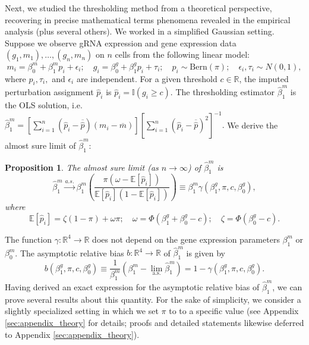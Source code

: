 \documentclass[12pt]{article}
\newtheorem{proposition}{Proposition}
\begin{document}
Next, we studied the thresholding method from a theoretical perspective, recovering in precise mathematical terms phenomena revealed in the empirical analysis (plus several others). We worked in a simplified Gaussian setting. Suppose we observe gRNA expression and gene expression data $(g_1, m_1), \dots, (g_n, m_n)$ on $n$ cells from the following linear model:
\begin{equation}\label{theoretical_model}
m_i = \beta^m_0 + \beta^m_1 p_i + \epsilon_i; \quad
g_i = \beta^g_0 + \beta^g_1 p_i + \tau_i; \quad
p_i \sim \textrm{Bern}(\pi); \quad
\epsilon_i, \tau_i \sim N(0,1),
\end{equation}
where $p_i, \tau_i,$ and $\epsilon_i$ are independent. For a given threshold $c \in \mathbb{R}$, the imputed perturbation assignment $\hat{p}_i$ is $\hat{p}_i = \mathbb{I}(g_i \geq c).$ The thresholding estimator $\hat{\beta}^m_1$ is the OLS solution, i.e. $\hat{\beta}^m_1 = \left[\sum_{i=1}^n (\hat{p}_i - \overline{\hat{p}})(m_i - \overline{m})\right]\left[\sum_{i=1}^n (\hat{p}_i - \overline{\hat{p}})^2\right]^{-1}.$ We derive the almost sure limit of $\hat{\beta}^m_1$: 
\begin{proposition}\label{prop:convergence}
	The almost sure limit (as $n \to \infty$) of $\hat{\beta}^m_1$ is
	\begin{equation}\label{thresh_est_intercepts}
	\hat{\beta}^m_1 \xrightarrow{a.s.} \beta^m_1 \left(\frac{ \pi( \omega - \mathbb{E}[ \hat{p}_i ])}{ \mathbb{E}[\hat{p}_i] (1 - \mathbb{E}[\hat{p}_i])}\right) \equiv \beta^m_1 \gamma(\beta^g_1, \pi, c, \beta^g_0), 
	\end{equation} where 
	$$
	\mathbb{E}[\hat{p}_i] = \zeta(1-\pi) + \omega\pi; \quad \omega = \Phi\left(\beta_1^g + \beta_0^g -c \right); \quad \zeta = \Phi\left( \beta^g_0 - c \right).$$
\end{proposition}
The function $\gamma: \mathbb{R}^4 \to \mathbb{R}$ does not depend on the gene expression parameters $\beta^m_1$ or $\beta^m_0$. The asymptotic relative bias $b: \mathbb{R}^4 \to \mathbb{R}$ of $\hat{\beta}^m_1$ is given by
$$b(\beta^g_1, \pi, c, \beta^g_0)  \equiv \frac{1}{\beta^m_1} \left(\beta^m_1 - \lim_\textrm{a.s.} \hat{\beta}^m_1 \right) = 1 - \gamma(\beta^g_1, \pi, c, \beta^g_0).$$
Having derived an exact expression for  the asymptotic relative bias of  $\hat{\beta}^m_1$, we can prove several results about this quantity. For the sake of simplicity, we consider a slightly specialized setting in which we set $\pi$ to to a specific value (see Appendix \ref{sec:appendix_theory} for details; proofs and detailed statements likewise deferred to Appendix \ref{sec:appendix_theory}).
\end{document}
